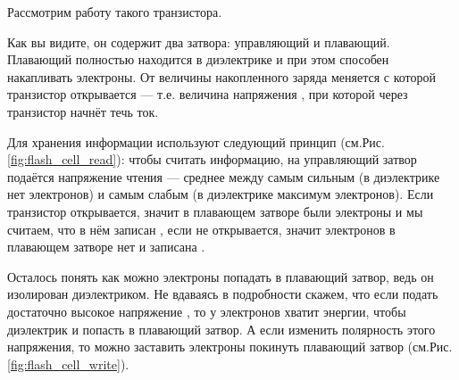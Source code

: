 % 

\par{Рассмотрим работу такого транзистора.}

\par{Как вы видите, он содержит два затвора: управляющий и плавающий. Плавающий полностью находится в диэлектрике и при этом способен накапливать электроны. От величины накопленного заряда меняется  с которой транзистор открывается --- т.е. величина напряжения , при которой через транзистор начнёт течь ток.}

\par{Для хранения информации используют следующий принцип (см.Рис.\ref{fig:flash_cell_read}): чтобы считать информацию, на управляющий затвор подаётся напряжение чтения --- среднее между самым сильным (в диэлектрике нет электронов) и самым слабым (в диэлектрике максимум электронов). Если транзистор открывается, значит в плавающем затворе были электроны и мы считаем, что в нём записан , если не открывается, значит электронов в плавающем затворе нет и записана .}

% 

\par{Осталось понять как можно  электроны попадать в плавающий затвор, ведь он изолирован диэлектриком. Не вдаваясь в подробности скажем, что если подать достаточно высокое напряжение , то у электронов хватит энергии, чтобы  диэлектрик и попасть в плавающий затвор. А если изменить полярность этого напряжения, то можно заставить электроны покинуть плавающий затвор (см.Рис.\ref{fig:flash_cell_write}).}

% 

